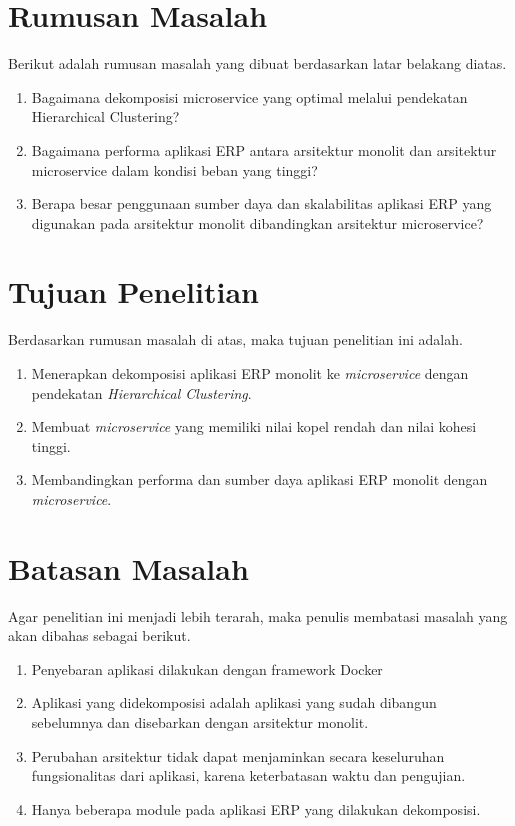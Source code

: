\hfill \break

\section{Rumusan Masalah}
Berikut adalah rumusan masalah yang dibuat berdasarkan latar belakang diatas.
\begin{enumerate}[nolistsep,leftmargin=0.5cm]
  \item Bagaimana dekomposisi microservice yang optimal melalui pendekatan Hierarchical Clustering?
  \item Bagaimana performa aplikasi ERP antara arsitektur monolit dan arsitektur microservice dalam kondisi beban yang tinggi?
  \item Berapa besar penggunaan sumber daya dan skalabilitas aplikasi ERP yang digunakan pada arsitektur monolit dibandingkan arsitektur microservice?\\
\end{enumerate}

\section{Tujuan Penelitian}
Berdasarkan rumusan masalah di atas, maka tujuan penelitian ini adalah.
\begin{enumerate}[nolistsep,leftmargin=0.5cm]
  \item Menerapkan dekomposisi aplikasi ERP monolit ke \textit{microservice} dengan pendekatan \textit{Hierarchical Clustering}.
  \item Membuat \textit{microservice} yang memiliki nilai kopel rendah dan nilai kohesi tinggi.
  \item Membandingkan performa dan sumber daya aplikasi ERP monolit dengan \textit{microservice}. \\
\end{enumerate}

\section{Batasan Masalah}
Agar penelitian ini menjadi lebih terarah, maka penulis membatasi masalah yang akan dibahas sebagai berikut.
\begin{enumerate}[nolistsep,leftmargin=0.5cm]
  \item Penyebaran aplikasi dilakukan dengan framework Docker
  \item Aplikasi yang didekomposisi adalah aplikasi yang sudah dibangun sebelumnya dan disebarkan dengan arsitektur monolit.
  \item Perubahan arsitektur tidak dapat menjaminkan secara keseluruhan fungsionalitas dari aplikasi, karena keterbatasan waktu dan pengujian.
  \item Hanya beberapa module pada aplikasi ERP yang dilakukan dekomposisi.\\
\end{enumerate}

